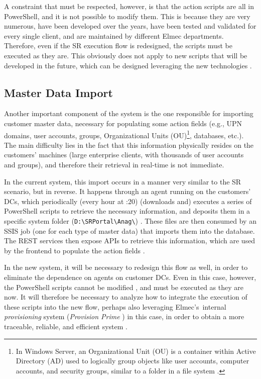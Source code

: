 A constraint that must be respected, however, is that the action scripts are all in PowerShell, and it is not possible to modify them. This is because they are very numerous, have been developed over the years, have been tested and validated for every single client, and are maintained by different Elmec departments. Therefore, even if the SR execution flow is redesigned, the scripts must be executed as they are. This obviously does not apply to new scripts that will be developed in the future, which can be designed leveraging the new technologies \cite{requirements_meeting}.

\subsection{Master Data Import}
Another important component of the system is the one responsible for importing customer master data, necessary for populating some action fields (e.g., UPN domains, user accounts, groups, Organizational Units (OU)\footnote{In Windows Server, an
Organizational Unit (OU) is a container within Active Directory (AD) used to logically group objects like user accounts, computer accounts, and security groups, similar to a folder in a file system \cite{ou}.}, databases, etc.). The main difficulty lies in the fact that this information physically resides on the customers' machines (large enterprise clients, with thousands of user accounts and groups), and therefore their retrieval in real-time is not immediate. 

In the current system, this import occurs in a manner very similar to the SR scenario, but in reverse. It happens through an agent running on the customers' DCs, which periodically (every hour at :20) (downloads and) executes a series of PowerShell scripts to retrieve the necessary information, and deposits them in a specific system folder (\texttt{D:\textbackslash SRPortal\textbackslash Anag\textbackslash}) \cite{srp_windowsservice_git}. These files are then consumed by an SSIS job (one for each type of master data) that imports them into the database. The REST services then expose APIs to retrieve this information, which are used by the frontend to populate the action fields \cite{srp_webservicerest_git}.

In the new system, it will be necessary to redesign this flow as well, in order to eliminate the dependence on agents on customer DCs. Even in this case, however, the PowerShell scripts cannot be modified \cite{requirements_meeting}, and must be executed as they are now. It will therefore be necessary to analyze how to integrate the execution of these scripts into the new flow, perhaps also leveraging Elmec's~internal \textit{provisioning} system (\textit{Provision Prime} \cite{provision_prime_git}) in this case, in order to obtain a more traceable, reliable, and efficient system \cite{requirements_meeting}.